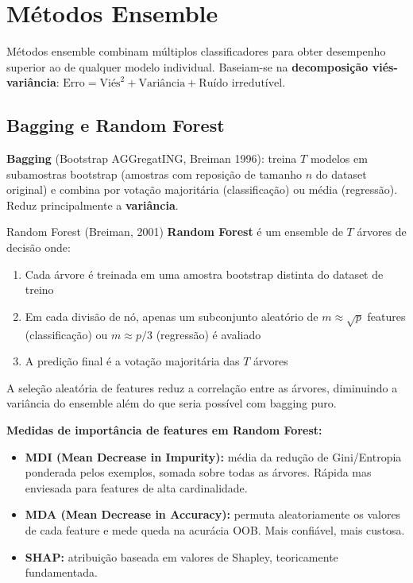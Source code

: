 \documentclass[12pt,a4paper]{article}
\begin{document}
\section{Métodos Ensemble}

Métodos ensemble combinam múltiplos classificadores para obter desempenho superior ao de qualquer modelo individual. Baseiam-se na \textbf{decomposição viés-variância}: $\text{Erro} = \text{Viés}^2 + \text{Variância} + \text{Ruído irredutível}$.

\subsection{Bagging e Random Forest}

\textbf{Bagging} (Bootstrap AGGregatING, Breiman 1996): treina $T$ modelos em subamostras bootstrap (amostras com reposição de tamanho $n$ do dataset original) e combina por votação majoritária (classificação) ou média (regressão). Reduz principalmente a \textbf{variância}.

\begin{definicaobox}{Random Forest (Breiman, 2001)}
\textbf{Random Forest} é um ensemble de $T$ árvores de decisão onde:
\begin{enumerate}
  \item Cada árvore é treinada em uma amostra bootstrap distinta do dataset de treino
  \item Em cada divisão de nó, apenas um subconjunto aleatório de $m \approx \sqrt{p}$ features (classificação) ou $m \approx p/3$ (regressão) é avaliado
  \item A predição final é a votação majoritária das $T$ árvores
\end{enumerate}
A seleção aleatória de features reduz a correlação entre as árvores, diminuindo a variância do ensemble além do que seria possível com bagging puro.
\end{definicaobox}

\textbf{Medidas de importância de features em Random Forest:}
\begin{itemize}
  \item \textbf{MDI (Mean Decrease in Impurity):} média da redução de Gini/Entropia ponderada pelos exemplos, somada sobre todas as árvores. Rápida mas enviesada para features de alta cardinalidade.
  \item \textbf{MDA (Mean Decrease in Accuracy):} permuta aleatoriamente os valores de cada feature e mede queda na acurácia OOB. Mais confiável, mais custosa.
  \item \textbf{SHAP:} atribuição baseada em valores de Shapley, teoricamente fundamentada.
\end{itemize}
\end{document}
